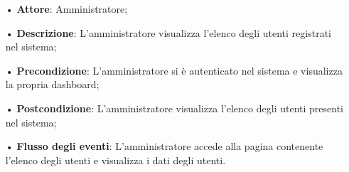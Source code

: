 \begin{itemize}
\item[•] \textbf{Attore}: Amministratore;

\item[•] \textbf{Descrizione}: L'amministratore visualizza l'elenco degli utenti registrati nel sistema;

\item[•] \textbf{Precondizione}: L'amministratore si è autenticato nel sistema e visualizza la propria dashboard;

\item[•] \textbf{Postcondizione}: L'amministratore visualizza l'elenco degli utenti presenti nel sistema;

\item[•] \textbf{Flusso degli eventi}: L'amministratore accede alla pagina contenente l'elenco degli utenti e visualizza i dati degli utenti. 
\end{itemize}

